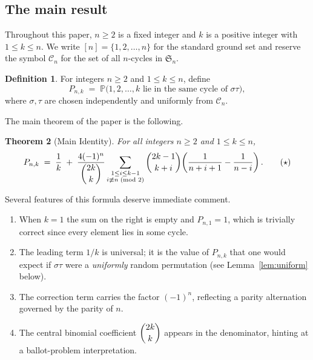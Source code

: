 \documentclass[12pt,a4paper]{article}
\newtheorem{theorem}{Theorem}[section]
\theoremstyle{definition}
\newtheorem{definition}[theorem]{Definition}
\newcommand{\Sn}{\mathfrak{S}_n}
\newcommand{\Cn}{\mathcal{C}_n}
\newcommand{\Prob}{\mathbb{P}}
\renewcommand{\binom}[2]{\dbinom{#1}{#2}}
\begin{document}
\subsection{The main result}

Throughout this paper, $n \ge 2$ is a fixed integer and $k$ is a
positive integer with $1 \le k \le n$.  We write
$[n] = \{1,2,\dots,n\}$ for the standard ground set and reserve the
symbol $\Cn$ for the set of all $n$-cycles in $\Sn$.

\begin{definition}
\label{def:Pnk}
For integers $n\ge 2$ and $1\le k\le n$, define
\[
P_{n,k} \;=\;
\Prob\bigl(
  1,2,\dots,k \text{ lie in the same cycle of } \sigma\tau
\bigr),
\]
where $\sigma,\tau$ are chosen independently and uniformly from $\Cn$.
\end{definition}

The main theorem of the paper is the following.

\begin{theorem}[Main Identity]
\label{thm:main}
For all integers $n\ge 2$ and $1\le k\le n$,
\[
P_{n,k}
\;=\;
\frac{1}{k}
\;+\;
\frac{4(-1)^{n}}{\dbinom{2k}{k}}
\sum_{\substack{1\le i\le k-1\\i\not\equiv n\!\pmod{2}}}
\binom{2k-1}{k+i}
\!\left(\frac{1}{n+i+1}-\frac{1}{n-i}\right).
\tag{$\star$}
\]
\end{theorem}

Several features of this formula deserve immediate comment.
\begin{enumerate}[label=(\roman*)]
\item When $k=1$ the sum on the right is empty and $P_{n,1}=1$, which is
  trivially correct since every element lies in some cycle.
\item The leading term $1/k$ is universal; it is the value of $P_{n,k}$
  that one would expect if $\sigma\tau$ were a \emph{uniformly} random
  permutation (see Lemma~\ref{lem:uniform} below).
\item The correction term carries the factor $(-1)^n$, reflecting a
  parity alternation governed by the parity of $n$.
\item The central binomial coefficient $\binom{2k}{k}$ appears in the
  denominator, hinting at a ballot-problem interpretation.
\end{enumerate}
\end{document}
